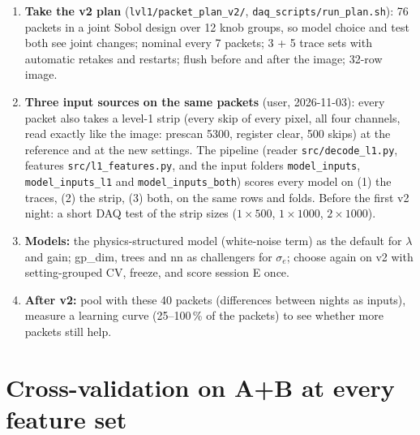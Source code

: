 \documentclass[11pt]{article}
\begin{document}
\begin{enumerate}
\item \textbf{Take the v2 plan} (\texttt{lvl1/packet\_plan\_v2/}, \texttt{daq\_scripts/run\_plan.sh}): 76 packets in a
  joint Sobol design over 12 knob groups, so model choice and test both see joint changes; nominal every 7 packets;
  3 + 5 trace sets with automatic retakes and restarts; flush before and after the image; 32-row image.
\item \textbf{Three input sources on the same packets} (user, 2026-11-03): every packet also takes a level-1 strip
  (every skip of every pixel, all four channels, read exactly like the image: prescan 5300, register clear, 500
  skips) at the reference and at the new settings. The pipeline (reader \texttt{src/decode\_l1.py}, features
  \texttt{src/l1\_features.py}, and the input folders \texttt{model\_inputs}, \texttt{model\_inputs\_l1} and
  \texttt{model\_inputs\_both}) scores every model on (1) the traces, (2) the strip, (3) both, on the same rows and
  folds. Before the first v2
  night: a short DAQ test of the strip sizes ($1\times500$, $1\times1000$, $2\times1000$).
\item \textbf{Models:} the physics-structured model (white-noise term) as the default for $\lambda$ and gain; gp\_dim,
  trees and nn as challengers for $\sigma_e$; choose again on v2 with setting-grouped CV, freeze, and score session E
  once.
\item \textbf{After v2:} pool with these 40 packets (differences between nights as inputs), measure a learning curve
  (25--100\,\% of the packets) to see whether more packets still help.
\end{enumerate}

\appendix


\section{Cross-validation on A+B at every feature set}
\begin{table}[h]
\centering\small
\caption{A+B cross-validation error (\%) of every model at every trace-feature set (32 packets, 127 rows).}

\end{table}
\end{document}
